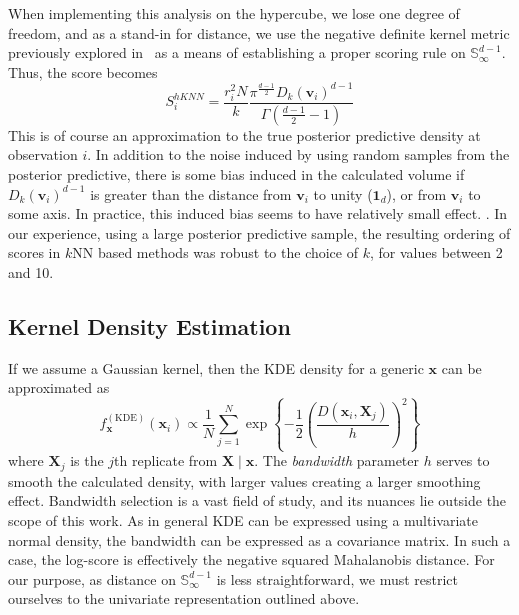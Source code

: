 When implementing this analysis on the hypercube, we lose one degree of freedom,
    and as a stand-in for distance, we use the negative definite kernel metric 
    previously explored in~\cite{trubey:pg} as a means of establishing a proper 
    scoring rule on $\mathbb{S}_{\infty}^{d-1}$.  Thus, the score becomes
    \begin{equation}
        \label{eq:ad_knn_h}
        S_i^{hKNN} = \frac{r_i^{2}N}{k}
        \frac{\pi^{\frac{d-1}{2}}D_{k}(\bm{v}_i)^{d-1}}{
          \Gamma\left(\frac{d-1}{2} - 1\right)}
  \end{equation}
    This is of course an approximation to the true posterior predictive density 
    at observation $i$.  In addition to the noise induced by using random 
    samples from the posterior predictive, there is some bias induced in the 
    calculated volume
    if $D_k(\bm{v}_i)^{d-1}$ is greater than the distance from $\bm{v}_i$ to 
  unity ($\bm{1}_d$), or from $\bm{v}_i$ to some axis.  In practice,
  this induced bias seems to have relatively small effect. 
  .
  In our experience, using a large posterior predictive sample, the resulting 
  ordering of scores in $k$NN based methods was robust to the choice of $k$, for 
  values between 2 and 10.

\subsection{Kernel Density Estimation}

If we assume a Gaussian kernel, then the KDE density for a generic $\bm{x}$ can 
    be approximated as 
    \begin{equation}
        \label{eq:ad_kde}
        f_{\bm{x}}^{(\text{KDE})}(\bm{x}_i) \propto 
        \frac{1}{N}\sum_{j = 1}^{N}\exp
        \left\lbrace-\frac{1}{2}\left(
        \frac{D(\bm{x}_i,\bm{X}_j)}{h}\right)^2\right\rbrace
    \end{equation}
    where $\bm{X}_j$ is the $j$th 
    replicate from $\bm{X}\mid\bm{x}$.  The \emph{bandwidth} parameter $h$ 
    serves to smooth the calculated density, with larger values creating a 
    larger smoothing effect.  Bandwidth selection is a vast field of study, and 
    its nuances lie outside the scope of this work.  As in general KDE can be 
    expressed using a multivariate normal density, the bandwidth can be 
    expressed as a covariance matrix.  In such a case, the log-score is 
    effectively the negative squared Mahalanobis distance.  For our purpose, as 
    distance on $\mathbb{S}_{\infty}^{d-1}$ is less straightforward, we must 
    restrict ourselves to the univariate representation outlined above.

